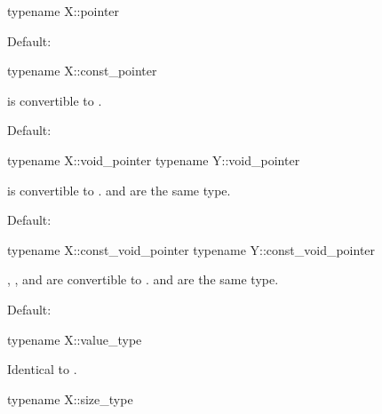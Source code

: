 \begin{itemdecl}
typename X::pointer
\end{itemdecl}

\begin{itemdescr}
\pnum
\remarks
Default: 
\end{itemdescr}

\begin{itemdecl}
typename X::const_pointer
\end{itemdecl}

\begin{itemdescr}
\pnum
\mandates
{} is convertible to .

\pnum
\remarks
Default: 
\end{itemdescr}

\begin{itemdecl}
typename X::void_pointer
typename Y::void_pointer
\end{itemdecl}

\begin{itemdescr}
\pnum
\mandates
{} is convertible to .
 and  are the same type.

\pnum
\remarks
Default:
\end{itemdescr}

\begin{itemdecl}
typename X::const_void_pointer
typename Y::const_void_pointer
\end{itemdecl}

\begin{itemdescr}
\pnum
\mandates
{}, , and 
are convertible to .
 and 
are the same type.

\pnum
\remarks
Default:
\end{itemdescr}

\begin{itemdecl}
typename X::value_type
\end{itemdecl}

\begin{itemdescr}
\pnum
\result
Identical to .
\end{itemdescr}

\begin{itemdecl}
typename X::size_type
\end{itemdecl}


